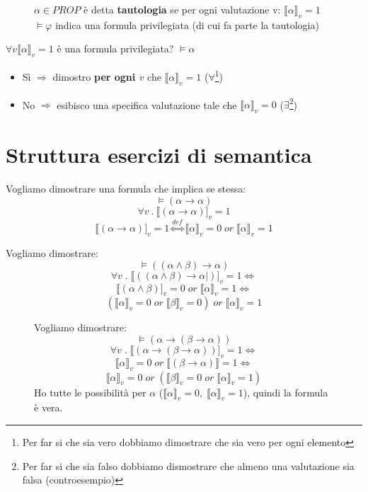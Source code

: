 \documentclass{article}
\theoremstyle{break}
\theoremstyle{break}
\theoremstyle{break}
\theoremstyle{break}
\begin{document}
\begin{figure}[H]
  \begin{definition}
    \( \alpha \in PROP \) è detta \textbf{tautologia} se per ogni valutazione
    v: \( \llbracket \alpha\rrbracket_v = 1 \)\\
    \(
    \models \varphi
    \) indica una formula privilegiata (di cui fa parte la tautologia)
  \end{definition}
\end{figure}

\( \forall v \llbracket \alpha\rrbracket_v = 1 \) è una formula privilegiata? \( \models \alpha \)
\begin{itemize}
  \item Sì \( \Rightarrow \) dimostro \textbf{per ogni \( v \)} che \( \llbracket \alpha\rrbracket_v = 1\) (\( \forall  \)\footnote{Per far si che sia vero
    dobbiamo dimostrare che sia vero per ogni elemento})
  \item No \( \Rightarrow \) esibisco una specifica valutazione
    tale che \( \llbracket \alpha\rrbracket_v= 0 \) (\( \exists  \)\footnote{Per far si che sia falso
    dobbiamo dismostrare che almeno una valutazione sia falsa (controesempio)})
\end{itemize}

\section{Struttura esercizi di semantica}
\begin{exercise}
  Vogliamo dimostrare una formula che implica se stessa:
  \[
    \models (\alpha \to \alpha)
  \]
  \[ \forall v\: . \: \llbracket (\alpha \to \alpha)]_v = 1 \]
  \[
    \llbracket (\alpha \to \alpha)]_v = 1 \stackrel{def}{\Leftrightarrow} \llbracket \alpha\rrbracket_v=0\; or\; \llbracket \alpha\rrbracket_v=1
  \]
\end{exercise}

\begin{exercise}
  Vogliamo dimostrare:
  \[
    \models ((\alpha \wedge \beta) \to \alpha)
  \]
  \[ \forall v\;.\; \llbracket ((\alpha \wedge \beta)\to \alpha|)]_v=1 \Leftrightarrow\]
  \[\llbracket (\alpha \wedge \beta)]_v = 0\; or\; \llbracket \alpha\rrbracket_v=1 \Leftrightarrow\]
  \[(\llbracket \alpha\rrbracket_v=0 \; or\; \llbracket \beta\rrbracket_v=0)\;or\; \llbracket \alpha\rrbracket_v=1\]
\end{exercise}
\begin{figure}[H]
  \begin{exercise}
    Vogliamo dimostrare:
    \[
      \models (\alpha \to (\beta \to \alpha))
    \]
    \[ \forall v\;.\; \llbracket (\alpha \to (\beta \to \alpha))]_v = 1 \Leftrightarrow \]
    \[ \llbracket \alpha\rrbracket_v=0 \; or \; \llbracket (\beta \to \alpha)\rrbracket = 1 \Leftrightarrow \]
    \[ \llbracket \alpha\rrbracket_v = 0 \; or \; (\llbracket \beta\rrbracket_v = 0 \; or \; \llbracket \alpha\rrbracket_v = 1) \]
    Ho tutte le possibilità per \( \alpha \) (\( \llbracket \alpha\rrbracket_v=0,\; \llbracket \alpha\rrbracket_v=1\)),
    quindi la formula è vera.
  \end{exercise}
\end{figure}
\end{document}
